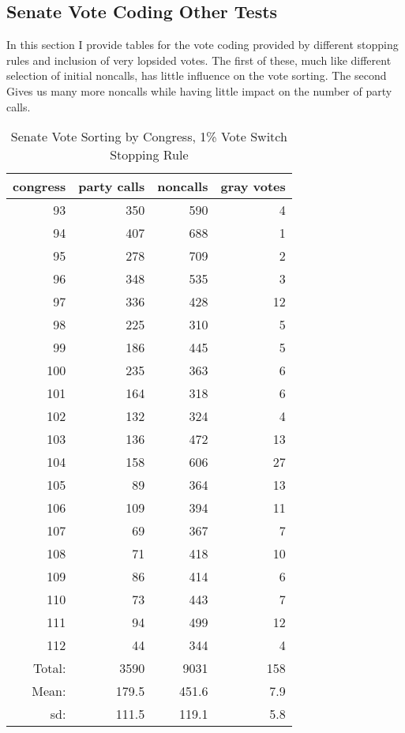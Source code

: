 \documentclass[12pt]{article}
\begin{document}
\clearpage

\subsection{Senate Vote Coding Other Tests}

In this section I provide tables for the vote coding provided by different stopping rules and inclusion of very lopsided votes. The first of these, much like different selection of initial noncalls, has little influence on the vote sorting. The second Gives us many more noncalls while having little impact on the number of party calls.

\begin{table}[ht]
	\centering
	\caption{Senate Vote Sorting by Congress, 1\% Vote Switch Stopping Rule}
	\begin{tabular}{rrrr}
		\hline
		congress & party calls & noncalls & gray votes \\ 
		\hline
		93 & 350 & 590 &   4 \\ 
		94 & 407 & 688 &   1 \\ 
		95 & 278 & 709 &   2 \\ 
		96 & 348 & 535 &   3 \\ 
		97 & 336 & 428 &  12 \\ 
		98 & 225 & 310 &   5 \\ 
		99 & 186 & 445 &   5 \\ 
		100 & 235 & 363 &   6 \\ 
		101 & 164 & 318 &   6 \\ 
		102 & 132 & 324 &   4 \\ 
		103 & 136 & 472 &  13 \\ 
		104 & 158 & 606 &  27 \\ 
		105 &  89 & 364 &  13 \\ 
		106 & 109 & 394 &  11 \\ 
		107 &  69 & 367 &   7 \\ 
		108 &  71 & 418 &  10 \\ 
		109 &  86 & 414 &   6 \\ 
		110 &  73 & 443 &   7 \\ 
		111 &  94 & 499 &  12 \\ 
		112 &  44 & 344 &   4 \\ 
		\hline
		Total: & 3590 & 9031 & 158 \\
		Mean: & 179.5 & 451.6 & 7.9 \\
		sd: & 111.5 & 119.1 & 5.8 \\
		\hline
	\end{tabular}
\end{table}
\end{document}
